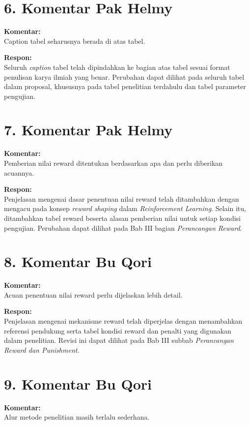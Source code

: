 \section*{6. Komentar Pak Helmy}
\textbf{Komentar:} \\
Caption tabel seharusnya berada di atas tabel.

\textbf{Respon:} \\
Seluruh \textit{caption} tabel telah dipindahkan ke bagian atas tabel sesuai format penulisan karya ilmiah yang benar. Perubahan dapat dilihat pada seluruh tabel dalam proposal, khususnya pada tabel penelitian terdahulu dan tabel parameter pengujian.

\vspace{0.5cm}

\section*{7. Komentar Pak Helmy}
\textbf{Komentar:} \\
Pemberian nilai reward ditentukan berdasarkan apa dan perlu diberikan acuannya.

\textbf{Respon:} \\
Penjelasan mengenai dasar penentuan nilai reward telah ditambahkan dengan mengacu pada konsep \textit{reward shaping} dalam \textit{Reinforcement Learning}. Selain itu, ditambahkan tabel reward beserta alasan pemberian nilai untuk setiap kondisi pengujian. Perubahan dapat dilihat pada Bab III bagian \textit{Perancangan Reward}.

\vspace{0.5cm}

\section*{8. Komentar Bu Qori}
\textbf{Komentar:} \\
Acuan penentuan nilai reward perlu dijelaskan lebih detail.

\textbf{Respon:} \\
Penjelasan mengenai mekanisme reward telah diperjelas dengan menambahkan referensi pendukung serta tabel kondisi reward dan penalti yang digunakan dalam penelitian. Revisi ini dapat dilihat pada Bab III subbab \textit{Perancangan Reward dan Punishment}.

\vspace{0.5cm}

\section*{9. Komentar Bu Qori}
\textbf{Komentar:} \\
Alur metode penelitian masih terlalu sederhana.

